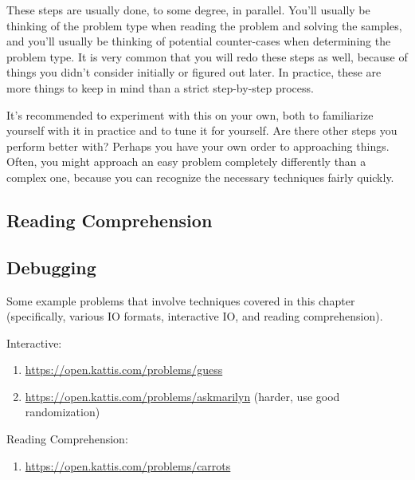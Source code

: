 These steps are usually done, to some degree, in parallel. You'll usually be thinking of the problem type when reading the problem and solving the samples, and you'll usually be thinking of potential counter-cases when determining the problem type. It is very common that you will redo these steps as well, because of things you didn't consider initially or figured out later. In practice, these are more things to keep in mind than a strict step-by-step process.

It's recommended to experiment with this on your own, both to familiarize yourself with it in practice and to tune it for yourself. Are there other steps you perform better with? Perhaps you have your own order to approaching things. Often, you might approach an easy problem completely differently than a complex one, because you can recognize the necessary techniques fairly quickly.

\subsection{Reading Comprehension}
\subsection{Debugging}

\hrulefill

Some example problems that involve techniques covered in this chapter (specifically, various IO formats, interactive IO, and reading comprehension).


Interactive: 
\begin{enumerate}
\item \url{https://open.kattis.com/problems/guess}
\item \url{https://open.kattis.com/problems/askmarilyn} (harder, use good randomization)
\end{enumerate}

Reading Comprehension:
\begin{enumerate}
\item \url{https://open.kattis.com/problems/carrots}
\end{enumerate}